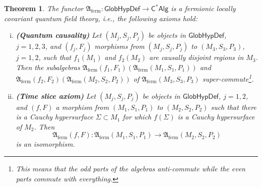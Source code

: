 \documentclass[a4paper,11pt]{amsart}
\newtheorem{thm}{Theorem}[section]
\theoremstyle{definition}
\begin{document}
\begin{thm}\label{thm:Aferm}
The functor ${\mathfrak{A}_\mathrm{ferm}}:{\mathsf{GlobHypDef}}\longrightarrow{\mathsf{C^*Alg}}$ is a fermionic locally covariant quantum field theory, i.e., the following axioms hold:
\begin{enumerate}[(i)]
\item\label{quantcaus2}
\textbf{(Quantum causality)}
Let $(M_j,S_j,P_j)$ be objects in ${\mathsf{GlobHypDef}}$, $j=1,2,3$, and $(f_j,F_j)$ morphisms from $(M_j,S_j,P_j)$ to $(M_3,S_3,P_3)$, $j=1,2$, such that $f_1(M_1)$ and $f_2(M_2)$ are causally disjoint regions in $M_3$.\\
Then the subalgebras ${\mathfrak{A}_\mathrm{ferm}}(f_1,F_1)({\mathfrak{A}_\mathrm{ferm}}(M_1,S_1,P_1))$ and ${\mathfrak{A}_\mathrm{ferm}}(f_2,F_2)({\mathfrak{A}_\mathrm{ferm}}(M_2,S_2,P_2))$ of ${\mathfrak{A}_\mathrm{ferm}}(M_3,S_3,P_3)$ super-commute\footnote{This means that the odd parts of the algebras anti-commute while the even parts commute with everything.}. 
\item\label{timeslice2}
\textbf{(Time slice axiom)}
Let $(M_j,S_j,P_j)$ be objects in ${\mathsf{GlobHypDef}}$, $j=1,2$, and $(f,F)$ a morphism from $(M_1,S_1,P_1)$ to $(M_2,S_2,P_2)$ such that there is a Cauchy hypersurface $\Sigma\subset M_1$ for which $f(\Sigma)$ is a Cauchy hypersurface of $M_2$.
Then 
$$
{\mathfrak{A}_\mathrm{ferm}}(f,F):{\mathfrak{A}_\mathrm{ferm}}(M_1,S_1,P_1) \to {\mathfrak{A}_\mathrm{ferm}}(M_2,S_2,P_2)
$$ 
is an isomorphism.
\end{enumerate}
\end{thm}
\end{document}
